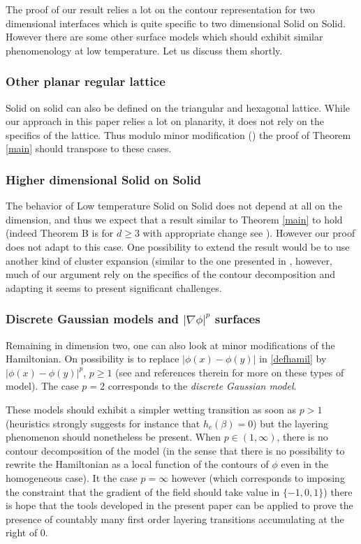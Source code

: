 \documentclass[JEP,XML,SOM,Unicode, NoFloatCountersInSection]{cedram}
\numberwithin{equation}{section}
\theoremstyle{plain}
\theoremstyle{definition}
\begin{document}
The proof of our result relies a lot on the contour representation for
two dimensional interfaces which is quite specific to two dimensional Solid on Solid. However there are some other surface models which should exhibit similar phenomenology at low temperature. Let us discuss them shortly.

\subsubsection{Other planar regular lattice}

Solid on solid can also be defined on the triangular and hexagonal lattice. While our approach in this paper relies a lot on planarity, it does not rely on the specifics of the lattice. Thus modulo minor modification (\hbox{\cite[\S 2.4]{cf:part1}}) the proof of Theorem \ref{main} should transpose to these cases.

\subsubsection{Higher dimensional Solid on Solid}
The behavior of Low temperature Solid on Solid does not depend at all on the dimension, and thus we expect that a result similar to Theorem \ref{main} to hold (indeed Theorem B is for $d\ge 3$ with appropriate change see \cite[\S 2.4]{cf:part1}).
However our proof does not adapt to this case. One possibility to extend the result would be to use another kind of cluster expansion (similar to the one presented in \cite{cf:BM}, however, much of our argument rely on the specifics of the contour decomposition and adapting it seems to present significant challenges.\enlargethispage{\baselineskip}%

\subsubsection{ Discrete Gaussian models and $|\nabla \phi|^p$ surfaces}

Remaining in dimension two, one can also look at minor modifications of the Hamiltonian. On possibility is to replace $|\phi(x)-\phi(y)|$ in \eqref{defhamil} by $|\phi(x)-\phi(y)|^p$, $p\ge 1$ (see \eg \cite{cf:PFF} and references therein for more on these types of model).
The case $p=2$ corresponds to the \textit{discrete Gaussian model}.

These models should exhibit a simpler wetting transition as soon as $p>1$
(heuristics strongly suggests for instance that $h_c(\beta)=0$) but the layering phenomenon should nonetheless be present.
When $p\in (1,\infty)$, there is no contour decomposition of the model (in the sense that there is no possibility to rewrite the Hamiltonian as a local function of the contours of $\phi$ even in the homogeneous case).
It the case $p=\infty$ however (which corresponds to imposing the constraint that the gradient of the field should take value in $\{-1,0,1\}$) there is hope that the tools developed in the present paper can be applied to prove the presence of countably many first order layering transitions accumulating at the right of $0$.
\end{document}
